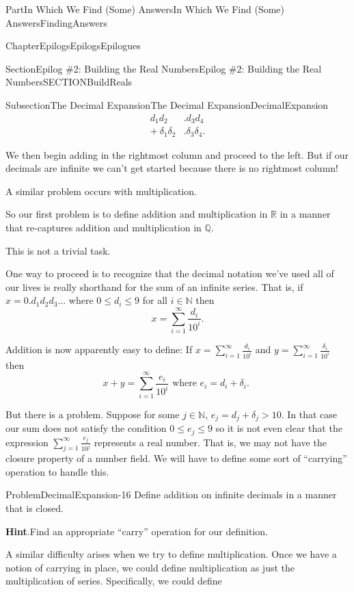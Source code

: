 \documentclass[oneside,10pt,]{book}
\newcommand{\blocktitlefont}{\relax}
\numberwithin{equation}{part}
\newcommand{\RR}{\mathbb {R}}
\newcommand{\QQ}{\mathbb {Q}}
\newcommand{\NN}{\mathbb {N}}
\newcommand{\amp}{&}
\begin{document}
\begin{partptx}{Part}{In Which We Find (Some) Answers}{}{In Which We Find (Some) Answers}{}{}{FindingAnswers}
\begin{chapterptx}{Chapter}{Epilogs}{}{Epilogs}{}{}{Epilogues}
\begin{sectionptx}{Section}{Epilog \#2: Building the Real Numbers}{}{Epilog \#2: Building the Real Numbers}{}{}{SECTIONBuildReals}
\begin{subsectionptx}{Subsection}{The Decimal Expansion}{}{The Decimal Expansion}{}{}{DecimalExpansion}
\begin{align*}
d_1d_2\amp .d_3d_4\\
+\   \delta_1\delta_2\amp .\delta_3\delta_4\text{.}
\end{align*}
%
\par
We then begin adding in the rightmost column and proceed to the left.  But if our decimals are infinite we can't get started because there is no rightmost column!%
\par
A similar problem occurs with multiplication.%
\par
So our first problem is to define addition and multiplication in \(\RR\) in a manner that re-captures addition and multiplication in \(\QQ\).%
\par
This is not a trivial task.%
\par
One way to proceed is to recognize that the decimal notation we've used all of our lives is really shorthand for the sum of an infinite series.  That is, if \(x=0.d_1d_2d_3\ldots\) where \(0\leq d_i\leq 9\) for all \(i\in\NN\) then%
\begin{equation*}
x=\sum_{i=1}^\infty\frac{d_i}{10^i}\text{.}
\end{equation*}
%
\par
Addition is now apparently easy to define: If \(x=\sum_{i=1}^\infty\frac{d_i}{10^i}\) and \(y=\sum_{i=1}^\infty\frac{\delta_i}{10^i}\) then%
\begin{equation*}
x+y= \sum_{i=1}^\infty\frac{e_i}{10^i} \text{ where \(e_i =d_i+\delta_i\). }
\end{equation*}
%
\par
But there is a problem.  Suppose for some \(j\in\NN\), \(e_j=d_j+\delta_j>10\).  In that case our sum does not satisfy the condition \(0\leq e_j\leq 9\) so it is not even clear that the expression \(\sum_{j=1}^\infty\frac{e_j}{10^j}\) represents a real number.  That is, we may not have the closure property of a number field.  We will have to define some sort of ``carrying'' operation to handle this.%
\begin{problem}{Problem}{}{DecimalExpansion-16}%
Define addition on infinite decimals in a manner that is closed.%
\par\smallskip%
\noindent\textbf{\blocktitlefont Hint}.\hypertarget{DecimalExpansion-16-3}{}\quad{}Find an appropriate ``carry'' operation for our definition.%
\end{problem}
A similar difficulty arises when we try to define multiplication.  Once we have a notion of carrying in place, we could define multiplication as just the multiplication of series.  Specifically, we could define%

\end{subsectionptx}
\end{sectionptx}
\end{chapterptx}
\end{partptx}
\end{document}
